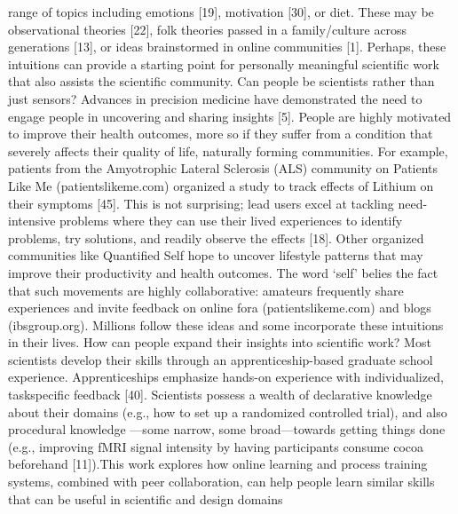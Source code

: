range of topics including emotions [19], motivation [30], or
diet. These may be observational theories [22], folk theories
passed in a family/culture across generations [13], or ideas
brainstormed in online communities [1]. Perhaps, these intuitions can provide a starting point for personally meaningful
scientific work that also assists the scientific community.
Can people be scientists rather than just sensors?
Advances in precision medicine have demonstrated the need
to engage people in uncovering and sharing insights [5]. People are highly motivated to improve their health outcomes,
more so if they suffer from a condition that severely affects
their quality of life, naturally forming communities. For example, patients from the Amyotrophic Lateral Sclerosis
(ALS) community on Patients Like Me (patientslikeme.com)
organized a study to track effects of Lithium on their symptoms [45]. This is not surprising; lead users excel at tackling
need-intensive problems where they can use their lived
experiences to identify problems, try solutions, and readily
observe the effects [18]. Other organized communities like
Quantified Self hope to uncover lifestyle patterns that may
improve their productivity and health outcomes. The word
‘self’ belies the fact that such movements are highly collaborative: amateurs frequently share experiences and invite
feedback on online fora (patientslikeme.com) and blogs
(ibsgroup.org). Millions follow these ideas and some incorporate these intuitions in their lives. How can people expand
their insights into scientific work?
Most scientists develop their skills through an apprenticeship-based graduate school experience. Apprenticeships emphasize hands-on experience with individualized, taskspecific feedback [40]. Scientists possess a wealth of declarative knowledge about their domains (e.g., how to set up a
randomized controlled trial), and also procedural knowledge
—some narrow, some broad—towards getting things done
(e.g., improving fMRI signal intensity by having participants
consume cocoa beforehand [11]).This work explores how
online learning and process training systems, combined with
peer collaboration, can help people learn similar skills that
can be useful in scientific and design domains

